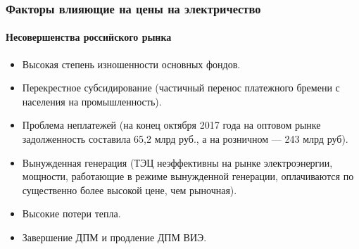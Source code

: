 \documentclass[c, dvipsnames]{beamer}  %
\begin{document}
\begin{frame}[shrink=5]
\frametitle{Факторы  влияющие на цены на электричество} 
\framesubtitle{Несовершенства российского рынка} 

\begin{itemize}
	\item  Высокая степень изношенности основных фондов.
	\item  Перекрестное субсидирование (частичный перенос платежного бремени с населения на промышленность).
	\item  Проблема неплатежей (на конец октября 2017 года на оптовом рынке задолженность составила 65,2 млрд руб., а на розничном — 243 млрд руб).
	\item  Вынужденная генерация  (ТЭЦ  неэффективны на рынке электроэнергии, мощности, работающие в режиме вынужденной генерации, оплачиваются по существенно более высокой цене, чем рыночная).
	\item  Высокие потери тепла.
	\item   Завершение ДПМ и продление ДПМ ВИЭ.
\end{itemize}

\end{frame}
\end{document}
